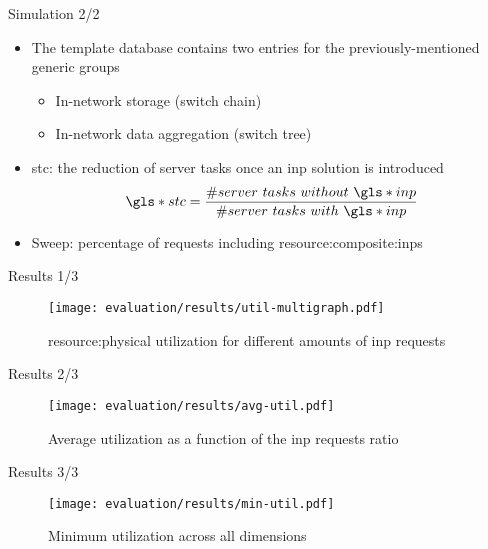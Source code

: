 \begin{frame}{Simulation 2/2}
    \begin{itemize}
        \item The template database contains two entries for the previously-mentioned generic groups
        \begin{itemize}
            \item In-network storage (switch chain)
            \item In-network data aggregation (switch tree)
        \end{itemize}
        \item \gls*{stc}: the reduction of server tasks once an \gls*{inp} solution is introduced
        \vspace{.2mm}
        \begin{equation}
        \label{stc_formula}
        \gls*{stc}=\dfrac{\#server\ tasks\ without\ \gls*{inp}}{\#server\ tasks\ with\ \gls*{inp}}
        \end{equation}
        \vspace{.2mm}
        \item Sweep: percentage of requests including \glspl{resource:composite:inp}
    \end{itemize}
\end{frame}

\begin{frame}{Results 1/3}
    \begin{figure}
        \captionsetup{font=scriptsize}
        \texttt{[image: evaluation/results/util-multigraph.pdf]}
        \caption{\gls*{resource:physical} utilization for different amounts of \gls*{inp} requests}
    \end{figure}
\end{frame}

\begin{frame}{Results 2/3}
    \vspace{4mm}
    \begin{figure}
        \captionsetup{font=footnotesize}
        \texttt{[image: evaluation/results/avg-util.pdf]}
        \vspace{2mm}
        \caption{Average  utilization as a function of the \gls*{inp} requests ratio}
    \end{figure}
\end{frame}

\begin{frame}{Results 3/3}
    \vspace{2mm}
    \begin{figure}
        \captionsetup{font=footnotesize}
        \texttt{[image: evaluation/results/min-util.pdf]}
        \vspace{2mm}
        \caption{Minimum  utilization across all dimensions}
    \end{figure}
\end{frame}
